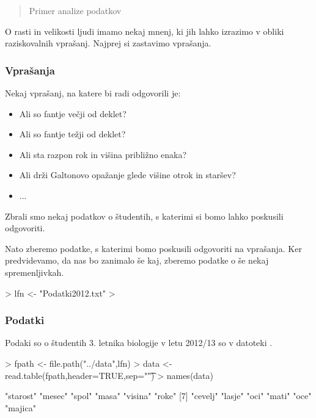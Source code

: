  {\maketitle}
 {\frame{\titlepage}}
\tableofcontents
\begin{abstract}
 Primer analize podatkov
\end{abstract}
O rasti in velikosti ljudi imamo nekaj mnenj, ki jih lahko izrazimo v obliki raziskovalnih vprašanj. Najprej si zastavimo vprašanja.
\begin{frame}[fragile]
\frametitle{Vprašanja}
Nekaj vprašanj, na katere bi radi odgovorili je:
\begin{itemize}
  \item Ali so fantje večji od deklet?
  \item Ali so fantje težji od deklet?
  \item Ali sta razpon rok in višina približno enaka?
  \item Ali drži Galtonovo opažanje glede višine otrok in staršev?
  \item ...
\end{itemize}
Zbrali smo nekaj podatkov o študentih, s katerimi si bomo lahko poskusili odgovoriti.
\end{frame}
Nato zberemo podatke, s katerimi bomo poskusili odgovoriti na vprašanja. Ker predvidevamo, da nas bo zanimalo še kaj, zberemo podatke o še nekaj spremenljivkah.
\begin{Schunk}
\begin{Sinput}
> lfn <- "Podatki2012.txt"
> 
\end{Sinput}
\end{Schunk}

\begin{frame}[fragile]
\frametitle{Podatki}
Podaki so o študentih 3. letnika biologije v letu 2012/13 so v datoteki .
\begin{Schunk}
\begin{Sinput}
> fpath <- file.path("../data",lfn)
> data <- read.table(fpath,header=TRUE,sep="\t")
> names(data)
\end{Sinput}
\begin{Soutput}
 [1] "starost" "mesec"   "spol"    "masa"    "visina"  "roke"   
 [7] "cevelj"  "lasje"   "oci"     "mati"    "oce"     "majica" 
\end{Soutput}
\end{Schunk}
\end{frame}








%
%

